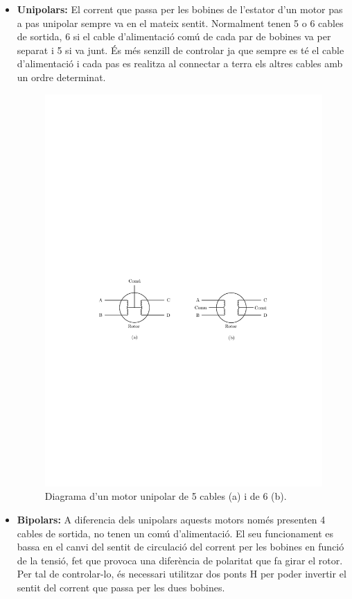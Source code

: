 \begin{itemize}
	\item \textbf{Unipolars:} El corrent que passa per les bobines de l'estator d'un motor pas a pas unipolar sempre va en el mateix sentit. Normalment tenen 5 o 6 cables de sortida, 6 si el cable d'alimentació comú de cada par de bobines va per separat i 5 si va junt. És més senzill de controlar ja que sempre es té el cable d'alimentació i cada pas es realitza al connectar a terra els altres cables amb un ordre determinat.
	
	\begin{figure}[H]
		\centering
		\includegraphics{Unipolar}
		\caption{Diagrama d'un motor unipolar de 5 cables (a) i de 6 (b).}
		\label{fig:unipolar}
	\end{figure}
	
	\item \textbf{Bipolars:} A diferencia dels unipolars aquests motors només presenten 4 cables de sortida, no tenen un comú d'alimentació. El seu funcionament es bassa en el canvi del sentit de circulació del corrent per les bobines en funció de la tensió, fet que provoca una diferència de polaritat que fa girar el rotor. Per tal de controlar-lo, és necessari utilitzar dos ponts H per poder invertir el sentit del corrent que passa per les dues bobines. 
	

\end{itemize}
